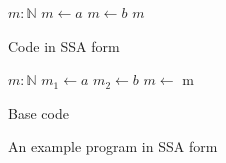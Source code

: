 \begin{figure}[h]
    \begin{minipage}[t]{0.5\textwidth}
        \centering
        \begin{algorithmic}
            \State $m: \mathbb{N}$
            \State $m \gets a$
            \Else
            \State $m \gets b$
            \EndIf
            \State \Return $m$
            \EndFunction
        \end{algorithmic}
        Code in SSA form
    \end{minipage}
    \begin{minipage}[t]{0.5\textwidth}
        \centering
        \begin{algorithmic}
            \State $m: \mathbb{N}$
            \State $m_1 \gets a$
            \Else
            \State $m_2 \gets b$
            \EndIf
            \State $m \gets$ 
            \State \Return m
            \EndFunction
        \end{algorithmic}
        Base code
    \end{minipage}
    \caption{An example program in SSA form}
    \label{fig:basics:SSA-phi}
\end{figure}